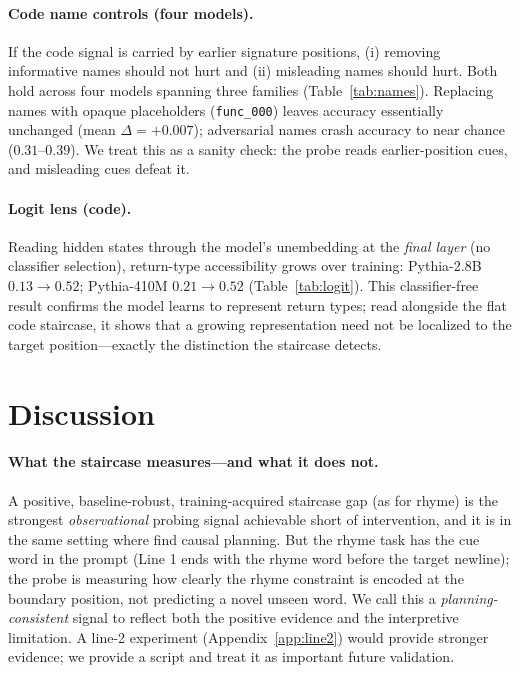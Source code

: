 \documentclass[11pt]{article}
\begin{document}
\paragraph{Code name controls (four models).} If the code signal is carried by
earlier signature positions, (i) removing informative names should not hurt and
(ii) misleading names should hurt. Both hold across four models spanning three
families (Table~\ref{tab:names}). Replacing names with opaque placeholders
(\texttt{func\_000}) leaves accuracy essentially unchanged (mean
$\Delta{=}+0.007$); adversarial names crash accuracy to near chance ($0.31$--$0.39$).
We treat this as a sanity check: the probe reads earlier-position cues, and
misleading cues defeat it.

\paragraph{Logit lens (code).} Reading hidden states through the model's
unembedding at the \emph{final layer} (no classifier selection), return-type
accessibility grows over training: Pythia-2.8B $0.13\rightarrow0.52$; Pythia-410M
$0.21\rightarrow0.52$ (Table~\ref{tab:logit}). This classifier-free result
confirms the model learns to represent return types; read alongside the flat code
staircase, it shows that a growing representation need not be localized to the
target position---exactly the distinction the staircase detects.

\section{Discussion}
\label{sec:discussion}

\paragraph{What the staircase measures---and what it does not.} A positive,
baseline-robust, training-acquired staircase gap (as for rhyme) is the strongest
\emph{observational} probing signal achievable short of intervention, and it is
in the same setting where \citet{maar2026} find causal planning. But the rhyme
task has the cue word in the prompt (Line 1 ends with the rhyme word before the
target newline); the probe is measuring how clearly the rhyme constraint is
encoded at the boundary position, not predicting a novel unseen word. We call
this a \emph{planning-consistent} signal to reflect both the positive evidence
and the interpretive limitation. A line-2 experiment (Appendix~\ref{app:line2})
would provide stronger evidence; we provide a script and treat it as important
future validation.
\end{document}
